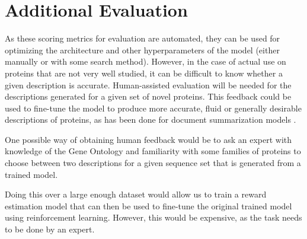 \documentclass{specification}
\begin{document}
 
%
%



\section*{Additional Evaluation}
As these scoring metrics for evaluation are automated, they can be used for optimizing the architecture and other hyperparameters of the model (either manually or with some search method). However, in the case of actual use on proteins that are not very well studied, it can be difficult to know whether a given description is accurate. Human-assisted evaluation will be needed for the descriptions generated for a given set of novel proteins. This feedback could be used to fine-tune the model to produce more accurate, fluid or generally desirable descriptions of proteins, as has been done for document summarization models \cite{finetuningWithHuman, learningToSummarize}.

One possible way of obtaining human feedback would be to ask an expert with knowledge of the Gene Ontology and familiarity with some families of proteins to choose between two descriptions for a given sequence set that is generated from a trained model.

Doing this over a large enough dataset would allow us to train a reward estimation model that can then be used to fine-tune the original trained model using reinforcement learning. However, this would be expensive, as the task needs to be done by an expert.

\printbibliography
\end{document}
